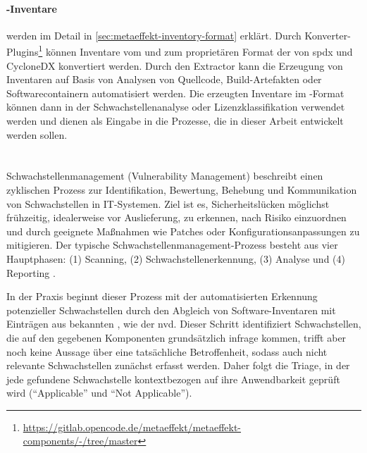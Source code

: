 \paragraph{\metaeffekt-Inventare}
werden im Detail in \autoref{sec:metaeffekt-inventory-format} erklärt.
Durch Konverter-Plugins\footnote{\url{https://gitlab.opencode.de/metaeffekt/metaeffekt-components/-/tree/master}} können Inventare vom und zum proprietären Format der \metaeffektsp von \acrshort{spdx} und CycloneDX konvertiert werden.
Durch den \metaeffektsp Extractor kann die Erzeugung von Inventaren auf Basis von Analysen von Quellcode, Build-Artefakten oder Softwarecontainern automatisiert werden.
Die erzeugten Inventare im \metaeffekt-Format können dann in der Schwachstellenanalyse oder Lizenzklassifikation verwendet werden und dienen als Eingabe in die Prozesse, die in dieser Arbeit entwickelt werden sollen.



\section{}\label{sec:grundlagen-vms}

Schwachstellenmanagement (Vulnerability Management) beschreibt einen zyklischen Prozess zur Identifikation, Bewertung, Behebung und Kommunikation von Schwachstellen in IT-Systemen.
Ziel ist es, Sicherheitslücken möglichst frühzeitig, idealerweise vor Auslieferung, zu erkennen, nach Risiko einzuordnen und durch geeignete Maßnahmen wie Patches oder Konfigurationsanpassungen zu mitigieren.
Der typische Schwachstellenmanagement-Prozess besteht aus vier Hauptphasen: (1) Scanning, (2) Schwachstellenerkennung, (3) Analyse und (4) Reporting \autocite{foreman2019vulnerabilityManagement}.

In der Praxis beginnt dieser Prozess mit der automatisierten Erkennung potenzieller Schwachstellen durch den Abgleich von Software-Inventaren mit Einträgen aus bekannten , wie der \acrshort{nvd}.
Dieser Schritt identifiziert Schwachstellen, die auf den gegebenen Komponenten grundsätzlich infrage kommen, trifft aber noch keine Aussage über eine tatsächliche Betroffenheit, sodass auch nicht relevante Schwachstellen zunächst erfasst werden.
Daher folgt die Triage, in der jede gefundene Schwachstelle kontextbezogen auf ihre Anwendbarkeit geprüft wird (\enquote{Applicable} und \enquote{Not Applicable}).

